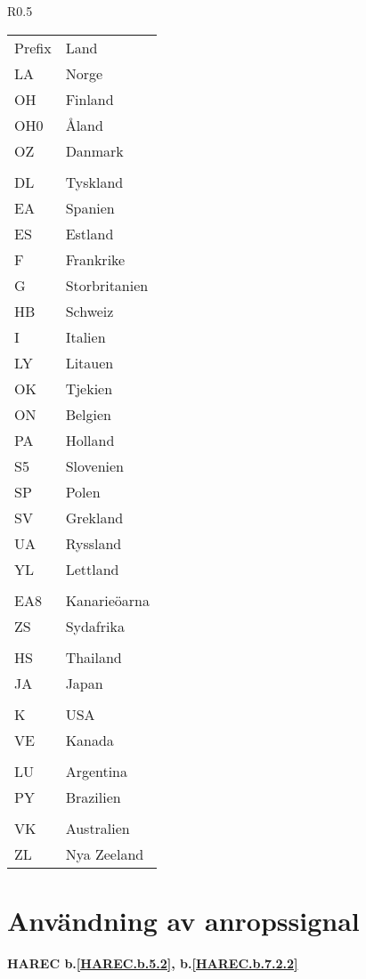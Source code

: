 \begin{wraptable}{R}{0.5\textwidth}
  \begin{tabular}{ll}
    Prefix & Land \\
    LA & Norge \\
    OH & Finland \\
    OH0 & Åland \\
    OZ & Danmark \\
    & \\
    DL & Tyskland \\
    EA & Spanien \\
    ES & Estland \\
    F & Frankrike \\
    G & Storbritanien \\
    HB & Schweiz \\
    I & Italien \\
    LY & Litauen \\
    OK & Tjekien \\
    ON & Belgien \\
    PA & Holland \\
    S5 & Slovenien \\
    SP & Polen \\
    SV & Grekland \\
    UA & Ryssland \\
    YL & Lettland \\
    & \\
    EA8 & Kanarieöarna \\
    ZS & Sydafrika \\
    & \\
    HS & Thailand \\
    JA & Japan \\
    & \\
    K & USA \\
    VE & Kanada \\
    & \\
    LU & Argentina \\
    PY & Brazilien \\
    & \\
    VK & Australien \\
    ZL & Nya Zeeland \\
\end{tabular}
\end{wraptable}


\section{Användning av anropssignal}
\textbf{HAREC
  b.\ref{HAREC.b.5.2}\label{myHAREC.b.5.2},
  b.\ref{HAREC.b.7.2.2}\label{myHAREC.b.7.2.2}
}


